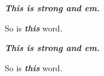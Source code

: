 \textbf{\emph{This is strong and em.}}

So is \textbf{\emph{this}} word.

\textbf{\emph{This is strong and em.}}

So is \textbf{\emph{this}} word.